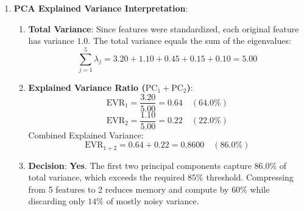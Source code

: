\begin{enumerate}
    \item \textbf{PCA Explained Variance Interpretation}:
    \begin{enumerate}[label=(\alph*)]
        \item \textbf{Total Variance}:
        Since features were standardized, each original feature has variance $1.0$. The total variance equals the sum of the eigenvalues:
        \begin{equation*}
        \sum_{j=1}^{5} \lambda_j = 3.20 + 1.10 + 0.45 + 0.15 + 0.10 = \mathbf{5.00}
        \end{equation*}
        \item \textbf{Explained Variance Ratio ($\text{PC}_1 + \text{PC}_2$)}:
        \begin{equation*}
        \text{EVR}_1 = \frac{3.20}{5.00} = 0.64 \quad (64.0\%)
        \end{equation*}
        \begin{equation*}
        \text{EVR}_2 = \frac{1.10}{5.00} = 0.22 \quad (22.0\%)
        \end{equation*}
        Combined Explained Variance:
        \begin{equation*}
        \text{EVR}_{1+2} = 0.64 + 0.22 = \mathbf{0.8600} \quad (\mathbf{86.0\%})
        \end{equation*}
        \item \textbf{Decision}:
        \textbf{Yes}. The first two principal components capture $86.0\%$ of total variance, which exceeds the required $85\%$ threshold. Compressing from 5 features to 2 reduces memory and compute by $60\%$ while discarding only $14\%$ of mostly noisy variance.
    \end{enumerate}
\end{enumerate}
